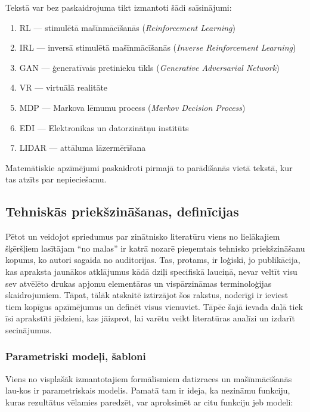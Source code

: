 \documentclass[12pt, a4paper]{article}
\numberwithin{equation}{section} %
\begin{document}
Tekstā var bez paskaidrojuma tikt izmantoti šādi saīsinājumi:

\begin{enumerate}
    \item RL --- stimulētā mašīnmācīšanās (\textit{Reinforcement Learning})
    \item IRL --- inversā stimulētā mašīnmācīšanās (\textit{Inverse Reinforcement Learning})
    \item GAN --- ģeneratīvais pretinieku tīkls (\textit{Generative Adversarial Network})
    \item VR --- virtuālā realitāte
    \item MDP --- Markova lēmumu process (\textit{Markov Decision Process})
    \item EDI --- Elektronikas un datorzinātņu institūts
    \item LIDAR --- attāluma lāzermērīšana
\end{enumerate}

Matemātiskie apzīmējumi paskaidroti pirmajā to parādīšanās vietā tekstā, kur tas atzīts par nepieciešamu.

\subsection{Tehniskās priekšzināšanas, definīcijas}

Pētot un veidojot spriedumus par zinātnisko literatūru viens no lielākajiem šķēršļiem lasītājam ``no malas'' ir katrā nozarē pieņemtais tehnisko priekšzināšanu kopums, ko autori sagaida no auditorijas. Tas, protams, ir loģiski, jo publikācija, kas apraksta jaunākos atklājumus kādā dziļi specifiskā lauciņā, nevar veltīt visu sev atvēlēto drukas apjomu elementāras un vispārzināmas terminoloģijas skaidrojumiem. Tāpat, tālāk atskaitē iztirzājot šos rakstus, noderīgi ir ieviest tiem kopīgus apzīmējumus un definēt visus vienuviet. Tāpēc šajā ievada daļā tiek īsi aprakstīti jēdzieni, kas jāizprot, lai varētu veikt literatūras analīzi un izdarīt secinājumus.

\subsubsection{Parametriski modeļi, šabloni}

Viens no visplašāk izmantotajiem formālismiem datizraces un mašīnmācīšanās lau-kos ir parametriskais modelis. Pamatā tam ir ideja, ka nezināmu funkciju, kuras rezultātus vēlamies paredzēt, var aproksimēt ar citu funkciju jeb modeli:
\end{document}
